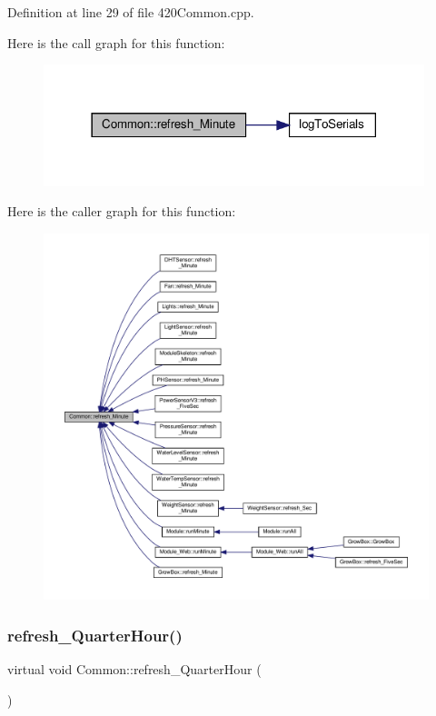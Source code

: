 Definition at line 29 of file 420\+Common.\+cpp.

Here is the call graph for this function\+:
\nopagebreak
\begin{figure}[H]
\begin{center}
\leavevmode
\includegraphics[width=314pt]{class_common_a14e4462a94bd118028ce1d487ca0292c_cgraph}
\end{center}
\end{figure}
Here is the caller graph for this function\+:
\nopagebreak
\begin{figure}[H]
\begin{center}
\leavevmode
\includegraphics[width=350pt]{class_common_a14e4462a94bd118028ce1d487ca0292c_icgraph}
\end{center}
\end{figure}
\mbox{\label{class_common_ad6c67e87cbd932e3b86ee656c1b540a7}} 
\subsubsection{\texorpdfstring{refresh\+\_\+\+Quarter\+Hour()}{refresh\_QuarterHour()}\hspace{0.1cm}{\footnotesize\ttfamily [1/2]}}
{\footnotesize\ttfamily virtual void Common\+::refresh\+\_\+\+Quarter\+Hour (\begin{DoxyParamCaption}{ }\end{DoxyParamCaption})\hspace{0.3cm}{\ttfamily [virtual]}}



